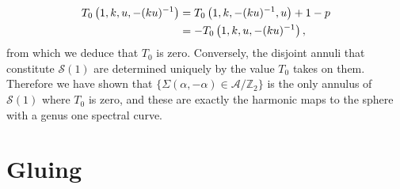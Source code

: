\documentclass{article}
\begin{document}
\begin{align*}
T_0\left(1,k,u,-(ku)^{-1}\right)
&= T_0\left(1,k,-(ku)^{-1},u\right) + 1-p \\
&= -T_0\left(1,k,u,-(ku)^{-1}\right),
\end{align*}
from which we deduce that $T_0$ is zero. Conversely, the disjoint annuli that constitute $\mathcal{S}(1)$ are determined uniquely by the value $T_0$ takes on them.
Therefore we have shown that $\{\Sigma(\alpha,-\alpha) \in \mathcal{A}/\mathbb{Z}_2\}$ is the only annulus of $\mathcal{S}(1)$ where $T_0$ is zero, and these are exactly the harmonic maps to the sphere with a genus one spectral curve.






















\section{Gluing}

\section{}
\end{document}
